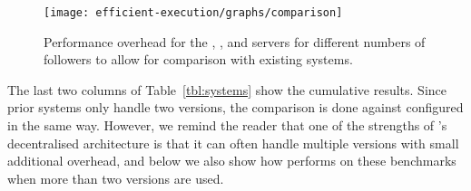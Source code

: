 \begin{figure}[!t]
 \centering
 \texttt{[image: efficient-execution/graphs/comparison]}
 \caption{Performance overhead for the \httpd, \thttpd, and \lighttpd
   servers for different numbers of followers to allow for comparison
   with existing systems.}
 \label{fig:comparison}
\end{figure}


The last two columns of Table~\ref{tbl:systems} show the cumulative
results.  Since prior systems only handle two versions, the comparison
is done against \varan configured in the same way.  However, we remind
the reader that one of the strengths of \varan's decentralised
architecture is that it can often handle multiple versions with small
additional overhead, and below we also show how \varan performs on
these benchmarks when more than two versions are used.

